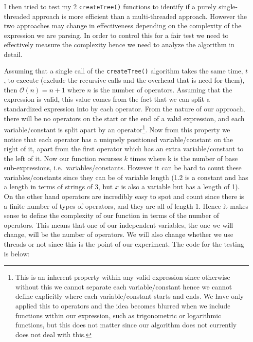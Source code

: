 \documentclass[../../../../../main.tex]{subfiles}
\begin{document}
\newpage\noindent
I then tried to test my 2 \texttt{createTree()} functions to identify if a purely single-threaded approach is more efficient than a multi-threaded approach. However the two approaches may change in effectiveness depending on the complexity of the expression we are parsing. In order to control this for a fair test we need to effectively measure the complexity hence we need to analyze the algorithm in detail.

Assuming that a single call of the \texttt{createTree()} algorithm takes the same time, $t$, to execute (exclude the recursive calls and the overhead that is need for them), then $\mathcal{O}(n) = n+1$ where $n$ is the number of operators. Assuming that the expression is valid, this value comes from the fact that we can split a standardized expression into by each operator. From the nature of our approach, there will be no operators on the start or the end of a valid expression, and each variable/constant is split apart by an operator\footnote{This is an inherent property within any valid expression since otherwise without this we cannot separate each variable/constant hence we cannot define explicitly where each variable/constant starts and ends. We have only applied this to operators and the idea becomes blurred when we include functions within our expression, such as trigonometric or logarithmic functions, but this does not matter since our algorithm does not currently does not deal with this.}. 
Now from this property we notice that each operator has a uniquely positioned variable/constant on the right of it, apart from the first operator which has an extra variable/constant to the left of it. Now our function recurses $k$ times where k is the number of base sub-expressions, i.e.\ variables/constants. However it can be hard to count these variables/constants since they can be of variable length (1.2 is a constant and has a length in terms of strings of 3, but $x$ is also a variable but has a length of 1). On the other hand operators are incredibly easy to spot and count since there is a finite number of types of operators, and they are all of length 1. Hence it makes sense to define the complexity of our function in terms of the number of operators. This means that one of our independent variables, the one we will change, will be the number of operators. We will also change whether we use threads or not since this is the point of our experiment. The code for the testing is below:
\end{document}
